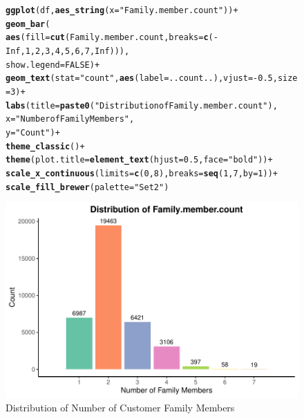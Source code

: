 \documentclass{article}\usepackage[]{graphicx}\usepackage[]{xcolor}
\makeatletter
\def\maxwidth{ %
  \ifdim\Gin@nat@width>\linewidth
    \linewidth
  \else
    \Gin@nat@width
  \fi
}
\newcommand{\hlnum}[1]{\textcolor[rgb]{0.686,0.059,0.569}{#1}}%
\newcommand{\hlsng}[1]{\textcolor[rgb]{0.192,0.494,0.8}{#1}}%
\newcommand{\hlopt}[1]{\textcolor[rgb]{0,0,0}{#1}}%
\newcommand{\hldef}[1]{\textcolor[rgb]{0.345,0.345,0.345}{#1}}%
\newcommand{\hlkwc}[1]{\textcolor[rgb]{0.333,0.667,0.333}{#1}}%
\newcommand{\hlkwd}[1]{\textcolor[rgb]{0.737,0.353,0.396}{\textbf{#1}}}%
\newenvironment{kframe}{%
 \def\at@end@of@kframe{}%
 \ifinner\ifhmode%
  \def\at@end@of@kframe{\end{minipage}}%
  \begin{minipage}{\columnwidth}%
 \fi\fi%
 \def\FrameCommand##1{\hskip\@totalleftmargin \hskip-\fboxsep
 \colorbox{shadecolor}{##1}\hskip-\fboxsep
     \hskip-\linewidth \hskip-\@totalleftmargin \hskip\columnwidth}%
 \MakeFramed {\advance\hsize-\width
   \@totalleftmargin\z@ \linewidth\hsize
   \@setminipage}}%
 {\par\unskip\endMakeFramed%
 \at@end@of@kframe}
\newenvironment{knitrout}{}{} %
\makeatother
\begin{document}
\begin{figure}[H] %
\centering
\begin{knitrout}
\color{fgcolor}\begin{kframe}
\begin{alltt}
\hlkwd{ggplot}\hldef{(df,} \hlkwd{aes_string}\hldef{(}\hlkwc{x} \hldef{=} \hlsng{"Family.member.count"}\hldef{))} \hlopt{+}
  \hlkwd{geom_bar}\hldef{(}
    \hlkwd{aes}\hldef{(}\hlkwc{fill} \hldef{=} \hlkwd{cut}\hldef{(Family.member.count,} \hlkwc{breaks} \hldef{=} \hlkwd{c}\hldef{(}\hlopt{-}\hlnum{Inf}\hldef{,} \hlnum{1}\hldef{,} \hlnum{2}\hldef{,} \hlnum{3}\hldef{,} \hlnum{4}\hldef{,} \hlnum{5}\hldef{,} \hlnum{6}\hldef{,} \hlnum{7}\hldef{,} \hlnum{Inf}\hldef{))),}
    \hlkwc{show.legend} \hldef{=} \hlnum{FALSE}\hldef{)} \hlopt{+}
  \hlkwd{geom_text}\hldef{(}\hlkwc{stat} \hldef{=} \hlsng{"count"}\hldef{,} \hlkwd{aes}\hldef{(}\hlkwc{label} \hldef{= ..count..),} \hlkwc{vjust} \hldef{=} \hlopt{-}\hlnum{0.5}\hldef{,} \hlkwc{size} \hldef{=} \hlnum{3}\hldef{)} \hlopt{+}
  \hlkwd{labs}\hldef{(}\hlkwc{title} \hldef{=} \hlkwd{paste0}\hldef{(}\hlsng{"Distribution of Family.member.count"}\hldef{),}
       \hlkwc{x} \hldef{=} \hlsng{"Number of Family Members"}\hldef{,}
       \hlkwc{y} \hldef{=} \hlsng{"Count"}\hldef{)} \hlopt{+}
  \hlkwd{theme_classic}\hldef{()} \hlopt{+}
  \hlkwd{theme}\hldef{(}\hlkwc{plot.title} \hldef{=} \hlkwd{element_text}\hldef{(}\hlkwc{hjust} \hldef{=} \hlnum{0.5}\hldef{,} \hlkwc{face} \hldef{=} \hlsng{"bold"}\hldef{))} \hlopt{+}
  \hlkwd{scale_x_continuous}\hldef{(}\hlkwc{limits} \hldef{=} \hlkwd{c}\hldef{(}\hlnum{0}\hldef{,} \hlnum{8}\hldef{),} \hlkwc{breaks} \hldef{=} \hlkwd{seq}\hldef{(}\hlnum{1}\hldef{,} \hlnum{7}\hldef{,} \hlkwc{by} \hldef{=} \hlnum{1}\hldef{))} \hlopt{+}
  \hlkwd{scale_fill_brewer}\hldef{(}\hlkwc{palette} \hldef{=} \hlsng{"Set2"}\hldef{)}
\end{alltt}
\end{kframe}
\includegraphics[width=\maxwidth]{figure/unnamed-chunk-33-1} 
\end{knitrout}
\vspace{0pt} %
\caption{Distribution of Number of Customer Family Members}
\end{figure}
\end{document}
